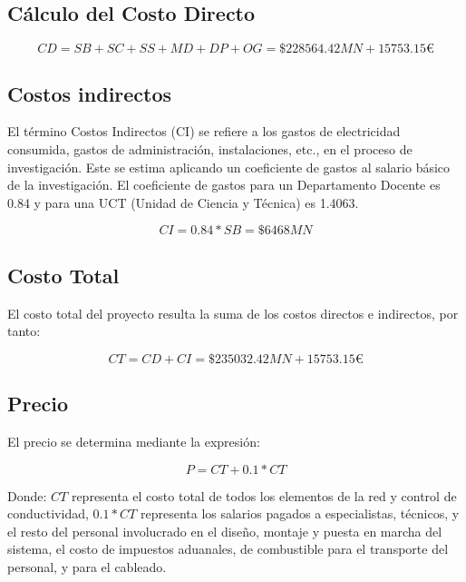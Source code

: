 \subsection*{Cálculo del Costo Directo}

\begin{equation}
    CD = SB + SC + SS + MD + DP + OG = \$228564.42 MN + 15753.15€
\end{equation}

\subsection*{Costos indirectos}

El término Costos Indirectos (CI) se refiere a los gastos de electricidad consumida, gastos de administración,
instalaciones, etc., en el proceso de investigación. Este se estima aplicando un coeficiente de gastos al
salario básico de la investigación. El coeficiente de gastos para un Departamento Docente es 0.84 y para una
UCT (Unidad de Ciencia y Técnica) es 1.4063.

\begin{equation}
    CI = 0.84 * SB = \$6468 MN
\end{equation}

\subsection*{Costo Total}

El costo total del proyecto resulta la suma de los costos directos e indirectos, por tanto:

\begin{equation}
    CT = CD + CI = \$235032.42MN + 15753.15€
\end{equation}

\subsection*{Precio}

El precio se determina mediante la expresión:

\begin{equation}
    P = CT + 0.1 * CT
\end{equation}

Donde: $CT$ representa el costo total de todos los elementos de la red y control de conductividad, $0.1*CT$
representa los salarios pagados a especialistas, técnicos, y el resto del personal involucrado en el diseño,
montaje y puesta en marcha del sistema, el costo de impuestos aduanales, de combustible para el transporte del
personal, y para el cableado.

